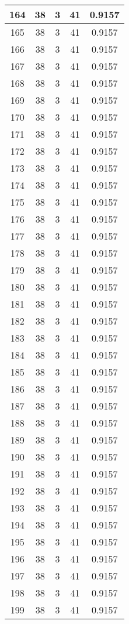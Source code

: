\documentclass[letterpaper, 12pt]{article}
\begin{document}
\begin{longtable}{|c|c|c|c|c|}
\hline
164 & 38 & 3 & 41 & 0.9157 \\
\hline
165 & 38 & 3 & 41 & 0.9157 \\
\hline
166 & 38 & 3 & 41 & 0.9157 \\
\hline
167 & 38 & 3 & 41 & 0.9157 \\
\hline
168 & 38 & 3 & 41 & 0.9157 \\
\hline
169 & 38 & 3 & 41 & 0.9157 \\
\hline
170 & 38 & 3 & 41 & 0.9157 \\
\hline
171 & 38 & 3 & 41 & 0.9157 \\
\hline
172 & 38 & 3 & 41 & 0.9157 \\
\hline
173 & 38 & 3 & 41 & 0.9157 \\
\hline
174 & 38 & 3 & 41 & 0.9157 \\
\hline
175 & 38 & 3 & 41 & 0.9157 \\
\hline
176 & 38 & 3 & 41 & 0.9157 \\
\hline
177 & 38 & 3 & 41 & 0.9157 \\
\hline
178 & 38 & 3 & 41 & 0.9157 \\
\hline
179 & 38 & 3 & 41 & 0.9157 \\
\hline
180 & 38 & 3 & 41 & 0.9157 \\
\hline
181 & 38 & 3 & 41 & 0.9157 \\
\hline
182 & 38 & 3 & 41 & 0.9157 \\
\hline
183 & 38 & 3 & 41 & 0.9157 \\
\hline
184 & 38 & 3 & 41 & 0.9157 \\
\hline
185 & 38 & 3 & 41 & 0.9157 \\
\hline
186 & 38 & 3 & 41 & 0.9157 \\
\hline
187 & 38 & 3 & 41 & 0.9157 \\
\hline
188 & 38 & 3 & 41 & 0.9157 \\
\hline
189 & 38 & 3 & 41 & 0.9157 \\
\hline
190 & 38 & 3 & 41 & 0.9157 \\
\hline
191 & 38 & 3 & 41 & 0.9157 \\
\hline
192 & 38 & 3 & 41 & 0.9157 \\
\hline
193 & 38 & 3 & 41 & 0.9157 \\
\hline
194 & 38 & 3 & 41 & 0.9157 \\
\hline
195 & 38 & 3 & 41 & 0.9157 \\
\hline
196 & 38 & 3 & 41 & 0.9157 \\
\hline
197 & 38 & 3 & 41 & 0.9157 \\
\hline
198 & 38 & 3 & 41 & 0.9157 \\
\hline
199 & 38 & 3 & 41 & 0.9157 \\
\hline
\end{longtable}
\end{document}
